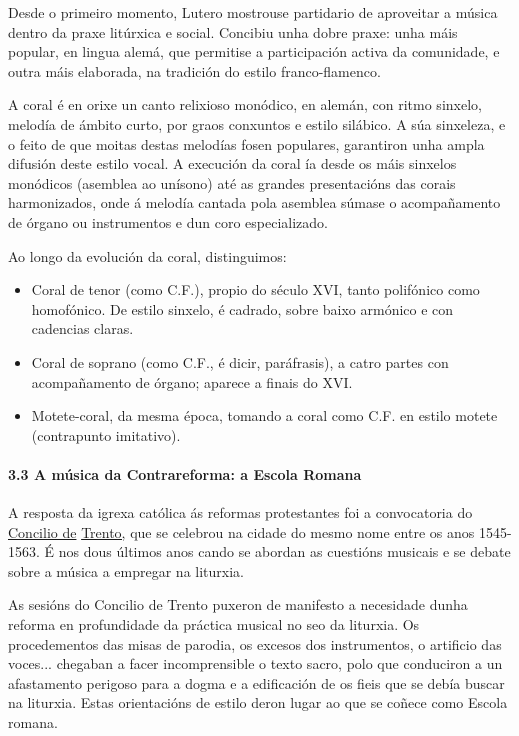 \documentclass[
]{article}
\begin{document}
Desde o primeiro momento, Lutero mostrouse partidario de aproveitar a
música dentro da praxe litúrxica e social. Concibiu unha dobre praxe:
unha máis popular, en lingua alemá, que permitise a participación activa
da comunidade, e outra máis elaborada, na tradición do estilo
franco-flamenco.

A coral é en orixe un canto relixioso monódico, en alemán, con ritmo
sinxelo, melodía de ámbito curto, por graos conxuntos e estilo silábico.
A súa sinxeleza, e o feito de que moitas destas melodías fosen
populares, garantiron unha ampla difusión deste estilo vocal. A
execución da coral ía desde os máis sinxelos monódicos (asemblea ao
unísono) até as grandes presentacións das corais harmonizados, onde á
melodía cantada pola asemblea súmase o acompañamento de órgano ou
instrumentos e dun coro especializado.

Ao longo da evolución da coral, distinguimos:

\begin{itemize}
\item
  Coral de tenor (como C.F.), propio do século XVI, tanto polifónico
  como homofónico. De estilo sinxelo, é cadrado, sobre baixo armónico e
  con cadencias claras.
\item
  Coral de soprano (como C.F., é dicir, paráfrasis), a catro partes con
  acompañamento de órgano; aparece a finais do XVI.
\item
  Motete-coral, da mesma época, tomando a coral como C.F. en estilo
  motete (contrapunto imitativo).
\end{itemize}

\hypertarget{33-a-muxfasica-da-contrareforma-a-escola-romana}{%
\paragraph{\texorpdfstring{\textbf{3.3 A música da Contrareforma: a
Escola
Romana}}{3.3 A música da Contrareforma: a Escola Romana}}\label{33-a-muxfasica-da-contrareforma-a-escola-romana}}

A resposta da igrexa católica ás reformas protestantes foi a
convocatoria do
\href{http://es.wikipedia.org/wiki/Concilio_de_Trento}{Concilio de}
\href{http://es.wikipedia.org/wiki/Concilio_de_Trento}{Trento,} que se
celebrou na cidade do mesmo nome entre os anos 1545-1563. É nos dous
últimos anos cando se abordan as cuestións musicais e se debate sobre a
música a empregar na liturxia.

As sesións do Concilio de Trento puxeron de manifesto a necesidade dunha
reforma en profundidade da práctica musical no seo da liturxia. Os
procedementos das misas de parodia, os excesos dos instrumentos, o
artificio das voces... chegaban a facer incomprensible o texto sacro,
polo que conduciron a un afastamento perigoso para a dogma e a
edificación de os fieis que se debía buscar na liturxia. Estas
orientacións de estilo deron lugar ao que se coñece como Escola romana.
\end{document}
